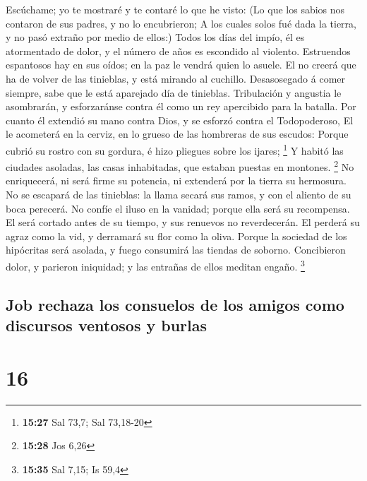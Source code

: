  Escúchame; yo te mostraré y te contaré lo que he visto:
 (Lo que los sabios nos contaron de sus padres, y no lo
encubrieron;  A los cuales solos fué dada la tierra, y no
pasó extraño por medio de ellos:)  Todos los días del
impío, él es atormentado de dolor, y el número de años es escondido al
violento.  Estruendos espantosos hay en sus oídos; en la
paz le vendrá quien lo asuele.  El no creerá que ha de
volver de las tinieblas, y está mirando al cuchillo. 
Desasosegado á comer siempre, sabe que le está aparejado día de
tinieblas.  Tribulación y angustia le asombrarán, y
esforzaránse contra él como un rey apercibido para la batalla.
 Por cuanto él extendió su mano contra Dios, y se esforzó
contra el Todopoderoso,  El le acometerá en la cerviz, en
lo grueso de las hombreras de sus escudos:  Porque cubrió
su rostro con su gordura, é hizo pliegues sobre los ijares; \footnote{\textbf{15:27}
  Sal 73,7; Sal 73,18-20}  Y habitó las ciudades
asoladas, las casas inhabitadas, que estaban puestas en montones.
\footnote{\textbf{15:28} Jos 6,26}  No enriquecerá, ni
será firme su potencia, ni extenderá por la tierra su hermosura.
 No se escapará de las tinieblas: la llama secará sus
ramos, y con el aliento de su boca perecerá.  No confíe
el iluso en la vanidad; porque ella será su recompensa. 
El será cortado antes de su tiempo, y sus renuevos no reverdecerán.
 El perderá su agraz como la vid, y derramará su flor
como la oliva.  Porque la sociedad de los hipócritas será
asolada, y fuego consumirá las tiendas de soborno. 
Concibieron dolor, y parieron iniquidad; y las entrañas de ellos meditan
engaño. \footnote{\textbf{15:35} Sal 7,15; Is 59,4}

\hypertarget{job-rechaza-los-consuelos-de-los-amigos-como-discursos-ventosos-y-burlas}{%
\subsection{Job rechaza los consuelos de los amigos como discursos
ventosos y
burlas}\label{job-rechaza-los-consuelos-de-los-amigos-como-discursos-ventosos-y-burlas}}

\hypertarget{section-15}{%
\section{16}\label{section-15}}

